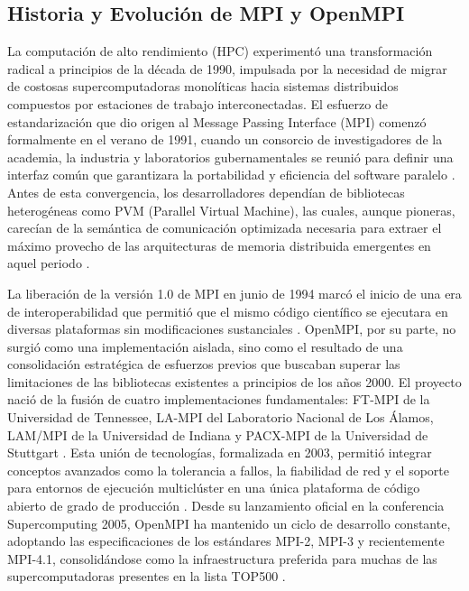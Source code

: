 



\subsection{Historia y Evolución de MPI y OpenMPI}

La computación de alto rendimiento (HPC) experimentó una transformación radical a principios de la década de 1990, impulsada por la necesidad de migrar de costosas supercomputadoras monolíticas hacia sistemas distribuidos compuestos por estaciones de trabajo interconectadas. El esfuerzo de estandarización que dio origen al Message Passing Interface (MPI) comenzó formalmente en el verano de 1991, cuando un consorcio de investigadores de la academia, la industria y laboratorios gubernamentales se reunió para definir una interfaz común que garantizara la portabilidad y eficiencia del software paralelo \cite{ref3_cristian_Walker1992}. Antes de esta convergencia, los desarrolladores dependían de bibliotecas heterogéneas como PVM (Parallel Virtual Machine), las cuales, aunque pioneras, carecían de la semántica de comunicación optimizada necesaria para extraer el máximo provecho de las arquitecturas de memoria distribuida emergentes en aquel periodo \cite{ref8_cristian_Nielsen2016}. 

La liberación de la versión 1.0 de MPI en junio de 1994 marcó el inicio de una era de interoperabilidad que permitió que el mismo código científico se ejecutara en diversas plataformas sin modificaciones sustanciales \cite{ref2_cristian_MPIStandard10}. OpenMPI, por su parte, no surgió como una implementación aislada, sino como el resultado de una consolidación estratégica de esfuerzos previos que buscaban superar las limitaciones de las bibliotecas existentes a principios de los años 2000. El proyecto nació de la fusión de cuatro implementaciones fundamentales: FT-MPI de la Universidad de Tennessee, LA-MPI del Laboratorio Nacional de Los Álamos, LAM/MPI de la Universidad de Indiana y PACX-MPI de la Universidad de Stuttgart \cite{ref4_cristian_Graham2005, ref5_cristian_Graham2006}. Esta unión de tecnologías, formalizada en 2003, permitió integrar conceptos avanzados como la tolerancia a fallos, la fiabilidad de red y el soporte para entornos de ejecución multiclúster en una única plataforma de código abierto de grado de producción \cite{ref6_cristian_Graham2007}. Desde su lanzamiento oficial en la conferencia Supercomputing 2005, OpenMPI ha mantenido un ciclo de desarrollo constante, adoptando las especificaciones de los estándares MPI-2, MPI-3 y recientemente MPI-4.1, consolidándose como la infraestructura preferida para muchas de las supercomputadoras presentes en la lista TOP500 \cite{ref1_cristian_MPIStandard41, ref4_cristian_Graham2005}.

